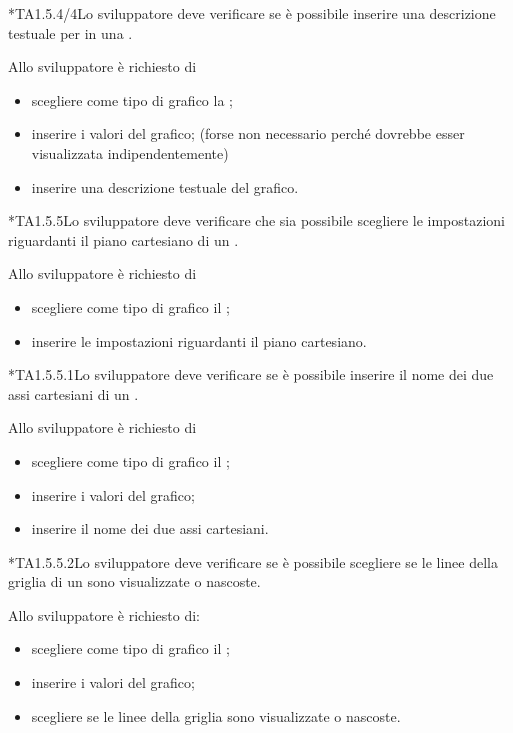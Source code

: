 	*{TA1.5.4/4}Lo sviluppatore deve verificare se è possibile inserire una descrizione testuale per in una .

		Allo sviluppatore è richiesto di
		\begin{itemize}
			\item scegliere come tipo di grafico la ;
			\item inserire i valori del grafico; (forse non necessario perché dovrebbe esser visualizzata indipendentemente)
			\item inserire una descrizione testuale del grafico.
		\end{itemize}

	*{TA1.5.5}Lo sviluppatore deve verificare che sia possibile scegliere le impostazioni riguardanti il piano cartesiano di un .

		Allo sviluppatore è richiesto di
		\begin{itemize}
			\item scegliere come tipo di grafico il ;
			\item inserire le impostazioni riguardanti il piano cartesiano.
		\end{itemize}

	*{TA1.5.5.1}Lo sviluppatore deve verificare se è possibile inserire il nome dei due assi cartesiani di un .

		Allo sviluppatore è richiesto di
		\begin{itemize}
			\item scegliere come tipo di grafico il ;
			\item inserire i valori del grafico;
			\item inserire il nome dei due assi cartesiani.
		\end{itemize}

	*{TA1.5.5.2}Lo sviluppatore deve verificare se è possibile scegliere se le linee della griglia di un  sono visualizzate o nascoste.

		Allo sviluppatore è richiesto di:
		\begin{itemize}
			\item scegliere come tipo di grafico il ;
			\item inserire i valori del grafico;
			\item scegliere se le linee della griglia sono visualizzate o nascoste.
		\end{itemize}

